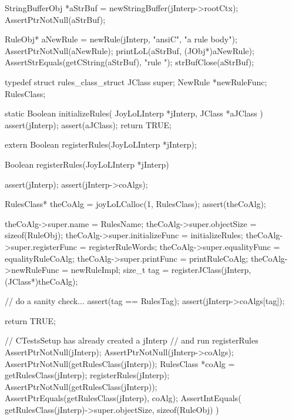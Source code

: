   StringBufferObj *aStrBuf = newStringBuffer(jInterp->rootCtx);
  AssertPtrNotNull(aStrBuf);
  
  RuleObj* aNewRule =
    newRule(jInterp, "ansiC", "a rule body");
  AssertPtrNotNull(aNewRule);
  printLoL(aStrBuf, (JObj*)aNewRule);
  AssertStrEquals(getCString(aStrBuf), "rule ");
  strBufClose(aStrBuf);
\stopCTest
\stopTestCase
\stopTestSuite

\startTestSuite[registerRules]

\startCHeader
typedef struct rules_class_struct {
  JClass       super;
  NewRule      *newRuleFunc;
} RulesClass;

\stopCHeader

\startCCode
static Boolean initializeRules(
  JoyLoLInterp *jInterp,
  JClass   *aJClass
) {
  assert(jInterp);
  assert(aJClass);
  return TRUE;
}
\stopCCode

\startCHeader
extern Boolean registerRules(JoyLoLInterp *jInterp);
\stopCHeader
{}

\startCCode
Boolean registerRules(JoyLoLInterp *jInterp) {
  assert(jInterp);
  assert(jInterp->coAlgs);
  
  RulesClass* theCoAlg
    = joyLoLCalloc(1, RulesClass);
  assert(theCoAlg);
  
  theCoAlg->super.name           = RulesName;
  theCoAlg->super.objectSize     = sizeof(RuleObj);
  theCoAlg->super.initializeFunc = initializeRules;
  theCoAlg->super.registerFunc   = registerRuleWords;
  theCoAlg->super.equalityFunc   = equalityRuleCoAlg;
  theCoAlg->super.printFunc      = printRuleCoAlg;
  theCoAlg->newRuleFunc = newRuleImpl;
  size_t tag =
    registerJClass(jInterp, (JClass*)theCoAlg);
  
  // do a sanity check...
  assert(tag == RulesTag);
  assert(jInterp->coAlgs[tag]);
   
  return TRUE;
}
\stopCCode


\startCTest
  // CTestsSetup has already created a jInterp
  // and run registerRules
  AssertPtrNotNull(jInterp);
  AssertPtrNotNull(jInterp->coAlgs);
  AssertPtrNotNull(getRulesClass(jInterp));
  RulesClass *coAlg = getRulesClass(jInterp);
  registerRules(jInterp);
  AssertPtrNotNull(getRulesClass(jInterp));
  AssertPtrEquals(getRulesClass(jInterp), coAlg);
  AssertIntEquals(
    getRulesClass(jInterp)->super.objectSize,
    sizeof(RuleObj)
  )
\stopCTest
\stopTestCase
\stopTestSuite
